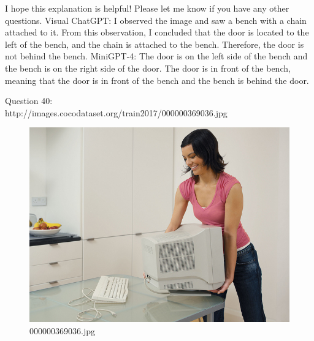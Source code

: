 \begin{enumerate}
        I hope this explanation is helpful! Please let me know if you have any other questions.
        \subitem Visual ChatGPT: I observed the image and saw a bench with a chain attached to it. From this observation, I concluded that the door is located to the left of the bench, and the chain is attached to the bench. Therefore, the door is not behind the bench.
        \subitem MiniGPT-4: The door is on the left side of the bench and the bench is on the right side of the door. The door is in front of the bench, meaning that the door is in front of the bench and the bench is behind the door.
    \end{enumerate}
    Question 40:\\http://images.cocodataset.org/train2017/000000369036.jpg
    \begin{figure}[h]
        \centering
        \includegraphics[width=0.8\linewidth]{../image set/easy/000000369036.jpg}
        \caption{000000369036.jpg}
    \end{figure}
